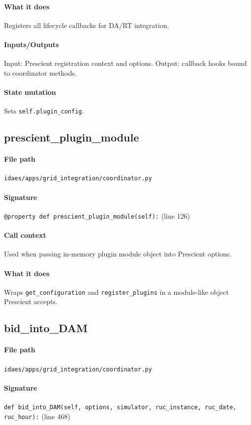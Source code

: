 \documentclass{article}
\begin{document}
\paragraph{What it does} Registers all lifecycle callbacks for DA/RT integration.
\paragraph{Inputs/Outputs} Input: Prescient registration context and options. Output: callback hooks bound to coordinator methods.
\paragraph{State mutation} Sets \texttt{self.plugin\_config}.

\subsection{prescient\_plugin\_module}\label{fn:prescient_plugin_module}
\paragraph{File path} \texttt{idaes/apps/grid\_integration/coordinator.py}
\paragraph{Signature} \texttt{@property def prescient\_plugin\_module(self):} (line 126)
\paragraph{Call context} Used when passing in-memory plugin module object into Prescient options.
\paragraph{What it does} Wraps \texttt{get\_configuration} and \texttt{register\_plugins} in a module-like object Prescient accepts.

\subsection{bid\_into\_DAM}\label{fn:bid_into_DAM}
\paragraph{File path} \texttt{idaes/apps/grid\_integration/coordinator.py}
\paragraph{Signature} \texttt{def bid\_into\_DAM(self, options, simulator, ruc\_instance, ruc\_date, ruc\_hour):} (line 468)
\end{document}
